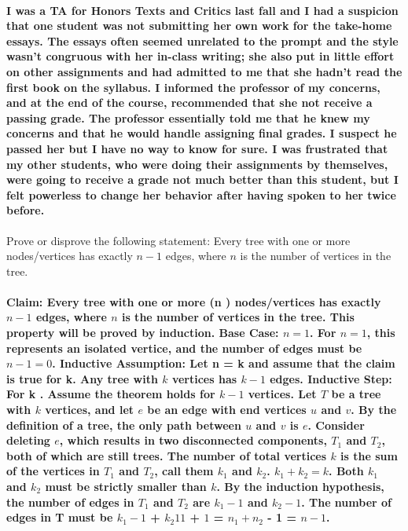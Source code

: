\documentclass{article}
\begin{document}
\begin{enumerate}
        \paragraph{I was a TA for Honors Texts and Critics last fall and I had a suspicion that one student was not submitting her own work for the take-home essays. The essays often seemed unrelated to the prompt and the style wasn't congruous with her in-class writing; she also put in little effort on other assignments and had admitted to me that she hadn't read the first book on the syllabus. I informed the professor of my concerns, and at the end of the course, recommended that she not receive a passing grade. The professor essentially told me that he knew my concerns and that he would handle assigning final grades. I suspect he passed her but I have no way to know for sure. I was frustrated that my other students, who were doing their assignments by themselves, were going to receive a grade not much better than this student, but I felt powerless to change her behavior after having spoken to her twice before.}
\end{enumerate}

\collab{\todo{}}

Prove or disprove the following statement: Every tree with one or more
nodes/vertices has exactly $n-1$ edges, where $n$ is the number of vertices in
the tree.

\paragraph{Claim: Every tree with one or more (n ) nodes/vertices has exactly $n-1$ edges, where $n$ is the number of vertices in the tree. This property will be proved by induction. Base Case: $n = 1$. For $n = 1$, this represents an isolated vertice, and the number of edges must be $n - 1 = 0$. Inductive Assumption: Let n = k and assume that the claim is true for k. Any tree with $k$ vertices has $k-1$ edges. Inductive Step: For k . Assume the theorem holds for $k-1$ vertices. Let $T$ be a tree with $k$ vertices, and let $e$ be an edge with end vertices $u$ and $v$. By the definition of a tree, the only path between $u$ and $v$ is $e$. Consider deleting $e$, which results in two disconnected components, $T_1$ and $T_2$, both of which are still trees. The number of total vertices $k$ is the sum of the vertices in $T_1$ and $T_2$, call them $k_1$ and $k_2$. $k_1 + k_2 = k$. Both $k_1$ and $k_2$ must be strictly smaller than $k$. By the induction hypothesis, the number of edges in $T_1$ and $T_2$ are $k_1 - 1$ and $k_2 - 1$. The number of edges in T must be $k_1 - 1$ + $k_2 1 1$ + $1$ = $n_1 + n_2$ - 1 = $n - 1$.}
 
\end{document}
